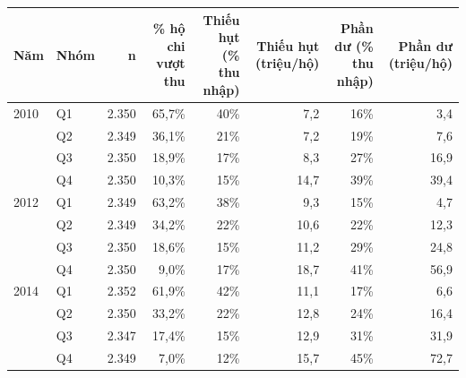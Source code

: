 \begin{tabular}{llrrrrrr}
\toprule
Năm & Nhóm & n & \% hộ chi vượt thu & Thiếu hụt (\% thu nhập) & Thiếu hụt (triệu/hộ) & Phần dư (\% thu nhập) & Phần dư (triệu/hộ) \\
\midrule
2010 & Q1 & 2.350 & 65,7\% & 40\% & 7,2 & 16\% & 3,4 \\
 & Q2 & 2.349 & 36,1\% & 21\% & 7,2 & 19\% & 7,6 \\
 & Q3 & 2.350 & 18,9\% & 17\% & 8,3 & 27\% & 16,9 \\
 & Q4 & 2.350 & 10,3\% & 15\% & 14,7 & 39\% & 39,4 \\
2012 & Q1 & 2.349 & 63,2\% & 38\% & 9,3 & 15\% & 4,7 \\
 & Q2 & 2.349 & 34,2\% & 22\% & 10,6 & 22\% & 12,3 \\
 & Q3 & 2.350 & 18,6\% & 15\% & 11,2 & 29\% & 24,8 \\
 & Q4 & 2.350 & 9,0\% & 17\% & 18,7 & 41\% & 56,9 \\
2014 & Q1 & 2.352 & 61,9\% & 42\% & 11,1 & 17\% & 6,6 \\
 & Q2 & 2.350 & 33,2\% & 22\% & 12,8 & 24\% & 16,4 \\
 & Q3 & 2.347 & 17,4\% & 15\% & 12,9 & 31\% & 31,9 \\
 & Q4 & 2.349 & 7,0\% & 12\% & 15,7 & 45\% & 72,7 \\
\bottomrule
\end{tabular}
